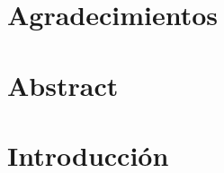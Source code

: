 \documentclass[12pt]{report} %
\begin{document}
	




\chapter*{Agradecimientos}


\chapter*{Abstract}






	


\tableofcontents
\thispagestyle{fancy}

\newpage %
\thispagestyle{empty}
\mbox{}

\listoffigures
\thispagestyle{fancy}

\newpage %
\thispagestyle{empty}
\mbox{}

\listoftables
\thispagestyle{fancy}

\newpage %
\thispagestyle{empty}
\mbox{}



\clearpage
{} %


\chapter{Introducción}

\end{document}
